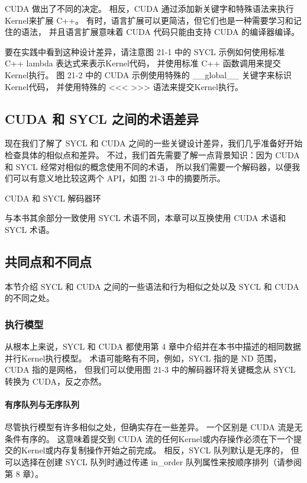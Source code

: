 CUDA 做出了不同的决定。 相反，CUDA 通过添加新关键字和特殊语法来执行Kernel来扩展 C++。 
有时，语言扩展可以更简洁，但它们也是一种需要学习和记住的语法，
并且语言扩展意味着 CUDA 代码只能由支持 CUDA 的编译器编译。

要在实践中看到这种设计差异，请注意图 21-1 中的 SYCL 示例如何使用标准 C++ lambda 表达式来表示Kernel代码，
并使用标准 C++ 函数调用来提交Kernel执行。 
图 21-2 中的 CUDA 示例使用特殊的 \_\_global\_\_ 关键字来标识Kernel代码，
并使用特殊的 <<< >>> 语法来提交Kernel执行。

\subsection{CUDA 和 SYCL 之间的术语差异}
现在我们了解了 SYCL 和 CUDA 之间的一些关键设计差异，我们几乎准备好开始检查具体的相似点和差异。 
不过，我们首先需要了解一点背景知识：因为 CUDA 和 SYCL 经常对相似的概念使用不同的术语，
所以我们需要一个解码器，以便我们可以有意义地比较这两个 API，如图 21-3 中的摘要所示。

{\color{red} CUDA 和 SYCL 解码器环}

与本书其余部分一致使用 SYCL 术语不同，本章可以互换使用 CUDA 术语和 SYCL 术语。

\subsection{共同点和不同点}
本节介绍 SYCL 和 CUDA 之间的一些语法和行为相似之处以及 SYCL 和 CUDA 的不同之处。

\subsubsection{执行模型}
从根本上来说，SYCL 和 CUDA 都使用第 4 章中介绍并在本书中描述的相同数据并行Kernel执行模型。 
术语可能略有不同，例如，SYCL 指的是 ND 范围，CUDA 指的是网格，
但我们可以使用图 21-3 中的解码器环将关键概念从 SYCL 转换为 CUDA，反之亦然。

\paragraph{有序队列与无序队列}

尽管执行模型有许多相似之处，但确实存在一些差异。 一个区别是 CUDA 流是无条件有序的。 
这意味着提交到 CUDA 流的任何Kernel或内存操作必须在下一个提交的Kernel或内存复制操作开始之前完成。 
相反，SYCL 队列默认是无序的，
但可以选择在创建 SYCL 队列时通过传递 in\_order 队列属性来按顺序排列（请参阅第 8 章）。

